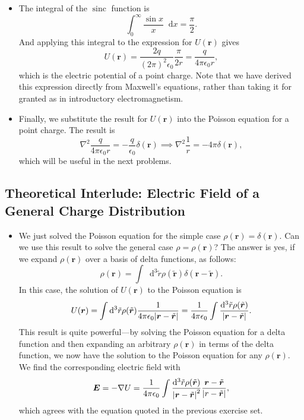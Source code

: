 \documentclass[11pt, a4paper]{article}
\newcommand{\diff}{\mathop{}\!\mathrm{d}} %
\renewcommand{\vec}[1]{\bm{#1}} %
\newcommand{\tvec}[1]{\tilde{\vec{#1}}} %
\renewcommand{\r}{\vec{r}}
\newcommand{\ee}{\epsilon_{0}}  %
\renewcommand{\grad}{\nabla}
\renewcommand{\laplacian}{\nabla^{2}}
\begin{document}
\begin{itemize}
	\item The integral of the $ \operatorname{sinc} $ function is
	\begin{equation*}
		\int_{0}^{\infty} \frac{\sin x}{x}\diff x = \frac{\pi}{2}.
	\end{equation*}
    And applying this integral to the expression for $ U(\r) $ gives
	\begin{equation*}
		U(\r) = \frac{2q}{(2\pi)^{2}\ee}\frac{\pi}{2r} = \frac{q}{4\pi \ee r},
	\end{equation*}
	which is the electric potential of a point charge. Note that we have derived this expression directly from Maxwell's equations, rather than taking it for granted as in introductory electromagnetism.
	
	\item Finally, we substitute the result for $ U(\r) $ into the Poisson equation for a point charge. The result is
	\begin{equation*}
		\laplacian \frac{q}{4\pi \ee r} = -\frac{q}{\ee}\delta (\r) \implies \nabla^{2}\frac{1}{r} = - 4\pi \delta(\r),
	\end{equation*}
	which will be useful in the next problems. 
	
\end{itemize}

\subsection{Theoretical Interlude: Electric Field of a General Charge Distribution}
\begin{itemize}
	\item We just solved the Poisson equation for the simple case $ \rho(\r) = \delta(\r) $. Can we use this result to solve the general case $ \rho = \rho(\r) $? The answer is yes, if we expand $ \rho(\r) $ over a basis of delta functions, as follows:
	\begin{equation*}
		\rho(\r) = \int \diff^{3}\tilde{r} \rho(\tvec{r}) \delta(\r - \tvec{r}).
	\end{equation*}
	In this case, the solution of $ U(\r) $ to the Poisson equation is
	\begin{equation*}
		U(\r) = \int \diff^{3}\tilde{r}\rho(\tvec{r}) \frac{1}{4\pi \ee\abs{\r - \tvec{r}}} = \frac{1}{4\pi \ee} \int\frac{\diff^{3}\tilde{r}\rho(\tvec{r})}{\abs{\r - \tvec{r}}}.
	\end{equation*}
	This result is quite powerful---by solving the Poisson equation for a delta function and then expanding an arbitrary $ \rho(\r) $ in terms of the delta function, we now have the solution to the Poisson equation for any $ \rho(\r) $. We find the corresponding electric field with
	\begin{equation*}
		\vec{E} = - \grad U = \frac{1}{4\pi \ee} \int\frac{\diff^{3}\tilde{r}\rho(\tvec{r})}{\abs{\r - \tvec{r}}^{2}} \frac{\r - \tvec{r}}{\abs{r - \tvec{r}}},
	\end{equation*}
	which agrees with the equation quoted in the previous exercise set.
\end{itemize}
\end{document}

